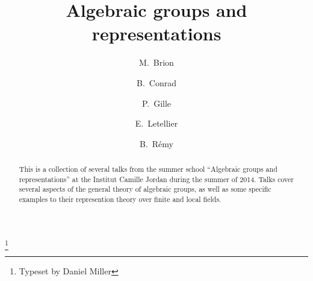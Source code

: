 \documentclass[english,letterpaper]{smfart}
\author{M.~Brion}
\author{B.~Conrad}
\author{P.~Gille}
\author{E.~Letellier}
\author{B.~R\'emy}
\title[Algebraic groups]{Algebraic groups and representations}
\begin{document}
\frontmatter

\begin{abstract}
This is a collection of several talks from the summer school ``Algebraic 
groups and representations'' at the Institut Camille Jordan during the 
summer of 2014.
Talks cover several aspects of the general theory of algebraic groups, as well 
as some specific examples to their represention theory over finite and local 
fields. 
\end{abstract}

\thanks{Typeset by Daniel Miller}

\maketitle
\tableofcontents
\mainmatter














\backmatter


\end{document}
